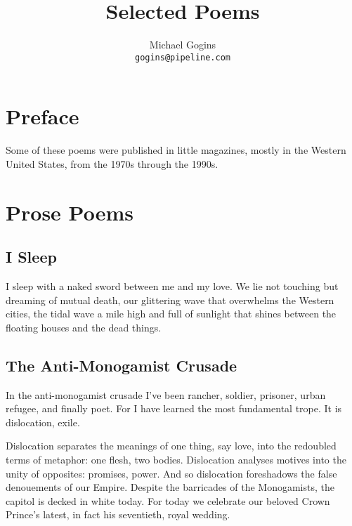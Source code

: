 \documentclass[english,11pt,letterpaper,onecolumn,parskip=full]{scrbook}
\begin{document}
\pagestyle{plain}
\frontmatter

\title{Selected Poems}
\author{Michael Gogins \\ \texttt{gogins@pipeline.com}}
\maketitle

\tableofcontents
\newpage
\chapter{Preface}
	Some of these poems were published in little magazines, mostly in the Western United States, from the 1970s through the 1990s.
\mainmatter
\pagestyle{headings}

\chapter{Prose Poems}

\section{I Sleep}

	I sleep with a naked sword between me and my love.  We lie not touching but dreaming of mutual death, our glittering wave that overwhelms the Western cities, the tidal wave a mile high and full of sunlight that shines between the floating houses and the dead things.



\newpage
\section{The Anti-Monogamist Crusade}

	In the anti-monogamist crusade I've been rancher, soldier, prisoner, urban refugee, and finally poet.  For I have learned the most fundamental trope.  It is dislocation, exile.

	Dislocation separates the meanings of one thing, say love, into the redoubled terms of metaphor:  one flesh, two bodies.  Dislocation analyses motives into the unity of opposites:  promises, power.  And so dislocation foreshadows the false denouements of our Empire.  Despite the barricades of the Monogamists, the capitol is decked in white today.  For today we celebrate our beloved Crown Prince's latest, in fact his seventieth, royal wedding.
\end{document}
